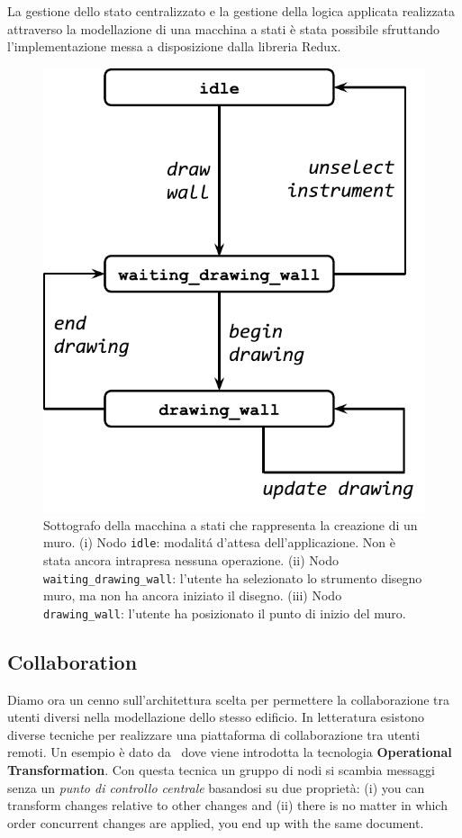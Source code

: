 La gestione dello stato centralizzato e la gestione della logica applicata realizzata  attraverso la modellazione di una macchina a stati è stata possibile sfruttando l'implementazione messa a disposizione dalla libreria Redux.


\begin{figure}[!t]
\centering
\includegraphics[width=0.6\linewidth]{contents/images/uc_draw_wall}

\caption{Sottografo della macchina a stati che rappresenta la creazione di un muro. (i) Nodo \texttt{idle}: modalit\'a d'attesa dell'applicazione. Non è stata ancora intrapresa nessuna operazione. (ii) Nodo \texttt{waiting\_drawing\_wall}: l'utente ha selezionato lo strumento disegno muro, ma non ha ancora iniziato il disegno. (iii) Nodo \texttt{drawing\_wall}: l'utente ha posizionato il punto di inizio del muro.}
\label{fig_uc_draw_wall}
\end{figure}




\subsection{Collaboration}  

Diamo ora un cenno sull'architettura scelta per permettere la collaborazione tra utenti diversi nella modellazione dello stesso edificio. In letteratura esistono diverse tecniche per realizzare una piattaforma di collaborazione tra utenti remoti. Un esempio \`e dato da~\cite{Ellis:1989:CCG:66926.66963} dove viene introdotta la tecnologia \textbf{Operational Transformation}. Con questa tecnica un gruppo di nodi si scambia messaggi senza un \textit{punto di controllo centrale} basandosi su due propriet\`a: (i) you can transform changes relative to other changes and (ii) there is no matter in which order concurrent changes are applied, you end up with the same document.\\

